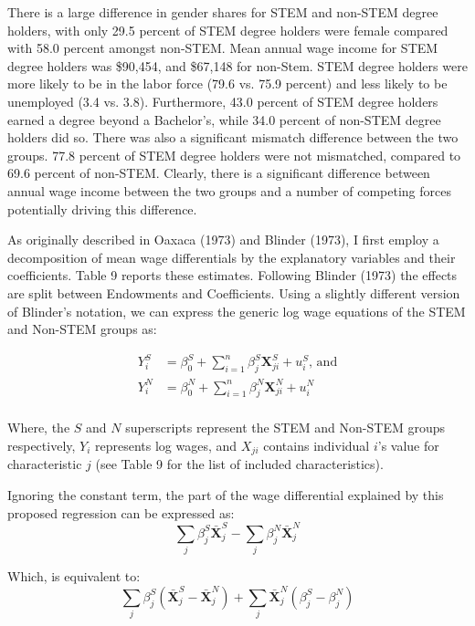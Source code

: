 \documentclass[11pt]{article}
\theoremstyle{definition}
\begin{document}
There is a large difference in gender shares for STEM and non-STEM degree holders, with only 29.5 percent of STEM degree holders were female compared with 58.0 percent amongst non-STEM.  Mean annual wage income for STEM degree holders was \$90,454, and \$67,148 for non-Stem.  STEM degree holders were more likely to be in the labor force (79.6 vs. 75.9 percent) and less likely to be unemployed (3.4 vs. 3.8).  Furthermore, 43.0 percent of STEM degree holders earned a degree beyond a Bachelor's, while 34.0 percent of non-STEM degree holders did so.  There was also a significant mismatch difference between the two groups.  77.8 percent of STEM degree holders were not mismatched, compared to 69.6 percent of non-STEM.  Clearly, there is a significant difference between annual wage income between the two groups and a number of competing forces potentially driving this difference.

As originally described in Oaxaca (1973) and Blinder (1973), I first employ a decomposition of mean wage differentials by the explanatory variables and their coefficients. Table 9 reports these estimates.  Following Blinder (1973) the effects are split between Endowments and Coefficients.  Using a slightly different version of Blinder's notation, we can express the generic log wage equations of the STEM and Non-STEM groups as:

\begin{equation*}
\begin{split}
Y^S_i &=\beta^S_0 + \sum_{i=1}^n \beta^S_j \boldsymbol{X}^S_{ji} + u^S_i\text{, and} \\
Y^N_i &=\beta^N_0 + \sum_{i=1}^n \beta^N_j \boldsymbol{X}^N_{ji} + u^N_i \\
\end{split}
\end{equation*}

Where, the $S$ and $N$ superscripts represent the STEM and Non-STEM groups respectively, $Y_i$ represents log wages, and \textbf{$X_{ji}$} contains individual $i$'s value for characteristic $j$ (see Table 9 for the list of included characteristics).  

Ignoring the constant term, the part of the wage differential explained by this proposed regression can be expressed as:
\begin{equation*}
\sum_j \beta^S_j \bar{\boldsymbol{X}}^S_j - \sum_j \beta^N_j \bar{\boldsymbol{X}}^N_j
\end{equation*}

Which, is equivalent to:
\begin{equation*}
\sum_j \beta^S_j (\bar{\boldsymbol{X}}^S_j- \bar{\boldsymbol{X}}^N_j) + \sum_j \bar{\boldsymbol{X}}^N_j (\beta^S_j - \beta^N_j )
\end{equation*}
\end{document}
